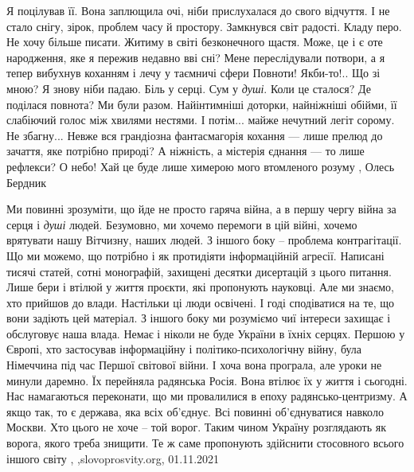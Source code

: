 Я поцілував її. Вона заплющила очі, ніби прислухалася до свого відчуття. І не
стало снігу, зірок, проблем часу й простору. Замкнувся світ радості.  Кладу
перо. Не хочу більше писати. Житиму в світі безконечного щастя. Може, це і є
оте народження, яке я пережив недавно вві сні? Мене переслідували потвори, а я
тепер вибухнув коханням і лечу у таємничі сфери Повноти! Якби-то!..  Що зі
мною? Я знову ніби падаю. Біль у серці. Сум у \emph{душі}. Коли це сталося? Де
поділася повнота?  Ми були разом. Найінтимніші доторки, найніжніші обійми, її
слабіючий голос між хвилями нестями. І потім... майже нечутний легіт сорому. Не
збагну...  Невже вся грандіозна фантасмагорія кохання — лише прелюд до зачаття,
яке потрібно природі? А ніжність, а містерія єднання — то лише рефлекси? О
небо!  Хай це буде лише химерою мого втомленого розуму
, Олесь Бердник

Ми повинні зрозуміти, що йде не просто гаряча війна, а в першу чергу війна за
серця і \emph{душі} людей. Безумовно, ми хочемо перемоги в цій війні, хочемо врятувати
нашу Вітчизну, наших людей.  З іншого боку – проблема контрагітації. Що ми
можемо, що потрібно і як протидіяти інформаційній агресії. Написані тисячі
статей, сотні монографій, захищені десятки дисертацій з цього питання. Лише
бери і втілюй у життя проєкти, які пропонують науковці.  Але ми знаємо, хто
прийшов до влади. Настільки ці люди освічені. І годі сподіватися на те, що вони
задіють цей матеріал. З іншого боку ми розуміємо чиї інтереси захищає і
обслуговує наша влада. Немає і ніколи не буде України в їхніх серцях.  Першою у
Європі, хто застосував інформаційну і політико-психологічну війну, була
Німеччина під час Першої світової війни. І хоча вона програла, але уроки не
минули даремно. Їх перейняла радянська Росія. Вона втілює їх у життя і
сьогодні. Нас намагаються переконати, що ми провалилися в епоху
радянсько-центризму. А якщо так, то є держава, яка всіх об’єднує. Всі повинні
об’єднуватися навколо Москви. Хто цього не хоче – той ворог. Таким чином
Україну розглядають як ворога, якого треба знищити. Те ж саме пропонують
здійснити стосовного всього іншого світу
, ,slovoprosvity.org, 01.11.2021
